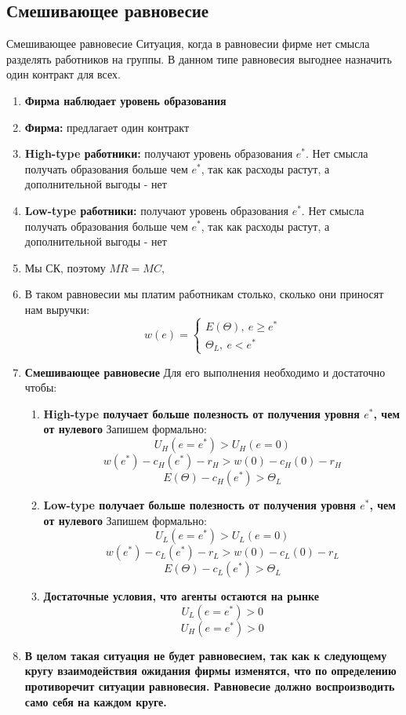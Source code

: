 \subsection{Смешивающее равновесие}
\begin{mybox}{Смешивающее равновесие}
Ситуация, когда в равновесии фирме нет смысла разделять работников на группы. В данном типе равновесия
выгоднее назначить один контракт для всех.
\end{mybox}
\begin{enumerate}
    \item \textbf{Фирма наблюдает уровень образования}
    \item \textbf{Фирма:} предлагает один контракт
    \item \textbf{High-type работники:} получают уровень образования $e^*$. Нет смысла получать образования больше чем $e^*$, так как расходы растут, а дополнительной выгоды - нет
    \item \textbf{Low-type работники:} получают уровень образования $e^*$. Нет смысла получать образования больше чем $e^*$, так как расходы растут, а дополнительной выгоды - нет
    \item Мы СК, поэтому $MR=MC$,
    \item В таком равновесии мы платим работникам столько, сколько они приносят нам выручки: $$w(e)=\begin{cases}
        E(\Theta), \ e \geq e^* \\
        \Theta_L, \ e < e^*
    \end{cases}$$
    \item \textbf{Смешивающее равновесие} Для его выполнения необходимо и достаточно чтобы:\begin{enumerate}
        \item \textbf{High-type получает больше полезность от получения уровня $e^*$, чем от нулевого} Запишем формально:$$U_H(e=e^*)>U_H(e=0)$$
        $$w(e^*)-c_H(e^*)-r_H>w(0)-c_H(0)-r_H$$
        $$E(\Theta)-c_H(e^*)>\Theta_L$$
        \item \textbf{Low-type получает больше полезность от получения уровня $e^*$, чем от нулевого} Запишем формально:$$U_L(e=e^*)>U_L(e=0)$$
        $$w(e^*)-c_L(e^*)-r_L>w(0)-c_L(0)-r_L$$
        $$E(\Theta)-c_L(e^*)>\Theta_L$$
        \item \textbf{Достаточные условия, что агенты остаются на рынке} $$U_L(e=e^*)>0$$
        $$U_H(e=e^*)>0$$
    \end{enumerate}
    \item \textbf{В целом такая ситуация не будет равновесием, так как к следующему кругу взаимодействия ожидания фирмы изменятся, что по определению противоречит ситуации равновесия. Равновесие должно воспроизводить само себя на каждом круге.}
\end{enumerate}

